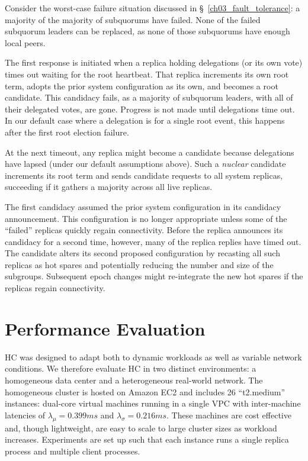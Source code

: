 Consider the worst-case failure situation discussed in \S~\ref{ch03_fault_tolerance}: a majority of the majority of subquorums have failed.
None of the failed subquorum leaders can be replaced, as none of those subquorums have enough local peers.

The first response is initiated when a replica holding delegations (or its own vote) times out waiting for the root heartbeat.
That replica increments its own root term, adopts the prior system configuration as its own, and becomes a root candidate.
This candidacy fails, as a majority of subquorum leaders, with all of their delegated votes, are gone.
Progress is not made until delegations time out.
In our default case where a delegation is for a single root event, this happens after the first root election failure.

At the next timeout, any replica might become a candidate because delegations have lapsed (under our default assumptions above).
Such a \emph{nuclear} candidate increments its root term and sends candidate requests to all system replicas, succeeding if it gathers a majority across all live replicas.

The first candidacy assumed the prior system configuration in its candidacy announcement.
This configuration is no longer appropriate unless some of the ``failed'' replicas quickly regain connectivity.
Before the replica announces its candidacy for a second time, however, many of the replica replies have timed out.
The candidate alters its second proposed configuration by recasting all such replicas as hot spares and potentially reducing the number and size of the subgroups.
Subsequent epoch changes might re-integrate the new hot spares if the replicas regain connectivity.

\section{Performance Evaluation}
\label{ch03_evaluation}

HC was designed to adapt both to dynamic workloads as well as variable network conditions.
We therefore evaluate HC in two distinct environments: a homogeneous data center and a heterogeneous real-world network.
The homogeneous cluster is hosted on Amazon EC2 and includes 26 ``t2.medium'' instances: dual-core virtual machines running in a single VPC with inter-machine latencies of $\lambda_{\mu}=0.399ms$ and $\lambda_{\sigma}=0.216ms$.
These machines are cost effective and, though lightweight, are easy to scale to large cluster sizes as workload increases.
Experiments are set up such that each instance runs a single replica process and multiple client processes.

